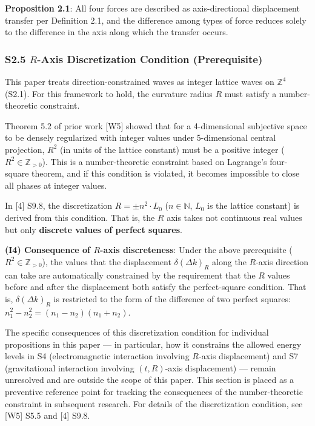 \documentclass[
  a4paper,11pt]{article}
\theoremstyle{definition}
\theoremstyle{remark}
\begin{document}
\textbf{Proposition 2.1}: All four forces are described as
axis-directional displacement transfer per Definition 2.1, and the
difference among types of force reduces solely to the difference in the
axis along which the transfer occurs.

\subsubsection{\texorpdfstring{S2.5 \(R\)-Axis Discretization Condition
(Prerequisite)}{S2.5 R-Axis Discretization Condition (Prerequisite)}}\label{s2.5-r-axis-discretization-condition-prerequisite}

This paper treats direction-constrained waves as integer lattice waves
on \(\mathbb{Z}^4\) (S2.1). For this framework to hold, the curvature
radius \(R\) must satisfy a number-theoretic constraint.

Theorem 5.2 of prior work {[}W5{]} showed that for a 4-dimensional
subjective space to be densely regularized with integer values under
5-dimensional central projection, \(R^2\) (in units of the lattice
constant) must be a positive integer (\(R^2 \in \mathbb{Z}_{>0}\)). This
is a number-theoretic constraint based on Lagrange's four-square
theorem, and if this condition is violated, it becomes impossible to
close all phases at integer values.

In {[}4{]} S9.8, the discretization \(R = \pm n^2 \cdot L_0\)
(\(n \in \mathbb{N}\), \(L_0\) is the lattice constant) is derived from
this condition. That is, the \(R\) axis takes not continuous real values
but only \textbf{discrete values of perfect squares}.

\textbf{(I4) Consequence of \(R\)-axis discreteness}: Under the above
prerequisite (\(R^2 \in \mathbb{Z}_{>0}\)), the values that the
displacement \(\delta(\Delta k)_R\) along the \(R\)-axis direction can
take are automatically constrained by the requirement that the \(R\)
values before and after the displacement both satisfy the perfect-square
condition. That is, \(\delta(\Delta k)_R\) is restricted to the form of
the difference of two perfect squares:
\(n_1^2 - n_2^2 = (n_1 - n_2)(n_1 + n_2)\).

The specific consequences of this discretization condition for
individual propositions in this paper --- in particular, how it
constrains the allowed energy levels in S4 (electromagnetic interaction
involving \(R\)-axis displacement) and S7 (gravitational interaction
involving \((t, R)\)-axis displacement) --- remain unresolved and are
outside the scope of this paper. This section is placed as a preventive
reference point for tracking the consequences of the number-theoretic
constraint in subsequent research. For details of the discretization
condition, see {[}W5{]} S5.5 and {[}4{]} S9.8.
\end{document}
